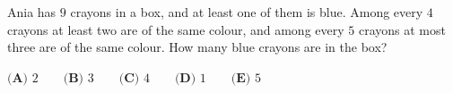 Ania has $9$ crayons in a box, and at least one of them is blue. Among every $4$ crayons at least two are of the same colour, and among every $5$ crayons at most three are of the same colour. How many blue crayons are in the box?

$\textbf{(A) }2\qquad\textbf{(B) }3\qquad\textbf{(C) }4\qquad\textbf{(D) }1\qquad\textbf{(E) }5$
